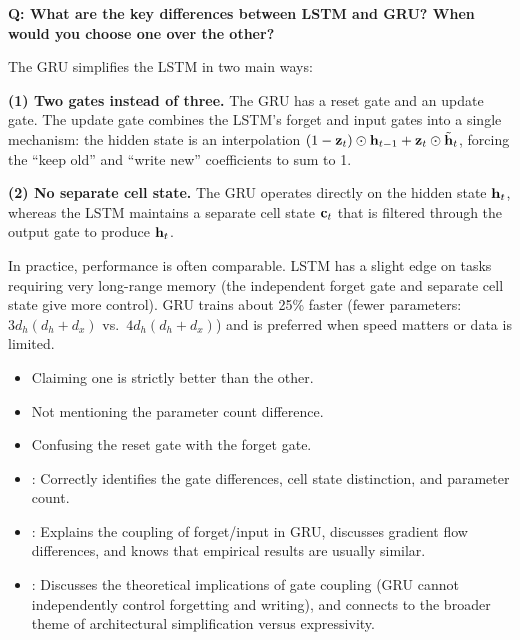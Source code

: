 \begin{interviewq}
\textbf{Q: What are the key differences between LSTM and GRU? When would
you choose one over the other?}

 \quad {} \quad
\badgefreq{\freqmed}

\stronganswer
The GRU simplifies the LSTM in two main ways:

\textbf{(1) Two gates instead of three.}  The GRU has a reset gate and
an update gate.  The update gate combines the LSTM's forget and input
gates into a single mechanism: the hidden state is an interpolation
$(1 - \mathbf{z}_t) \odot \mathbf{h}_{t-1} + \mathbf{z}_t \odot
\tilde{\mathbf{h}}_t$, forcing the ``keep old'' and ``write new'' coefficients
to sum to 1.

\textbf{(2) No separate cell state.}  The GRU operates directly on the
hidden state $\mathbf{h}_t$, whereas the LSTM maintains a separate cell state
$\mathbf{c}_t$ that is filtered through the output gate to produce $\mathbf{h}_t$.

In practice, performance is often comparable.  LSTM has a slight edge
on tasks requiring very long-range memory (the independent forget gate
and separate cell state give more control).  GRU trains about 25\%
faster (fewer parameters: $3d_h(d_h + d_x)$ vs.\ $4d_h(d_h + d_x)$)
and is preferred when speed matters or data is limited.

\redflags
\begin{itemize}
\item Claiming one is strictly better than the other.
\item Not mentioning the parameter count difference.
\item Confusing the reset gate with the forget gate.
\end{itemize}


\goodgreat
\begin{itemize}
\item {}: Correctly identifies the gate differences, cell
  state distinction, and parameter count.
\item {}: Explains the coupling of forget/input in GRU,
  discusses gradient flow differences, and knows that empirical
  results are usually similar.
\item {}: Discusses the theoretical implications of gate
  coupling (GRU cannot independently control forgetting and writing),
  and connects to the broader theme of architectural simplification
  versus expressivity.
\end{itemize}

\end{interviewq}

